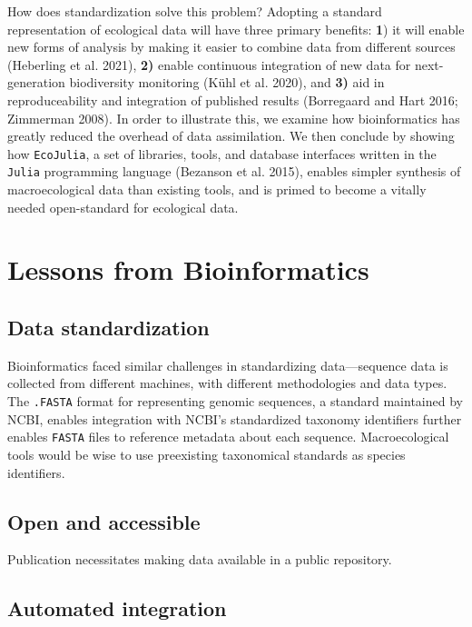 \documentclass[11pt]{article}
\begin{document}
How does standardization solve this problem? Adopting a standard
representation of ecological data will have three primary benefits:
\textbf{1}) it will enable new forms of analysis by making it easier to
combine data from different sources (Heberling et al. 2021), \textbf{2)}
enable continuous integration of new data for next-generation
biodiversity monitoring (Kühl et al. 2020), and \textbf{3)} aid in
reproduceability and integration of published results (Borregaard and
Hart 2016; Zimmerman 2008). In order to illustrate this, we examine how
bioinformatics has greatly reduced the overhead of data assimilation. We
then conclude by showing how \texttt{EcoJulia}, a set of libraries,
tools, and database interfaces written in the \texttt{Julia} programming
language (Bezanson et al. 2015), enables simpler synthesis of
macroecological data than existing tools, and is primed to become a
vitally needed open-standard for ecological data.

\hypertarget{lessons-from-bioinformatics}{%
\section{Lessons from
Bioinformatics}\label{lessons-from-bioinformatics}}

\hypertarget{data-standardization}{%
\subsection{Data standardization}\label{data-standardization}}

Bioinformatics faced similar challenges in standardizing data---sequence
data is collected from different machines, with different methodologies
and data types. The \texttt{.FASTA} format for representing genomic
sequences, a standard maintained by NCBI, enables integration with
NCBI's standardized taxonomy identifiers further enables \texttt{FASTA}
files to reference metadata about each sequence. Macroecological tools
would be wise to use preexisting taxonomical standards as species
identifiers.

\hypertarget{open-and-accessible}{%
\subsection{Open and accessible}\label{open-and-accessible}}

Publication necessitates making data available in a public repository.

\hypertarget{automated-integration}{%
\subsection{Automated integration}\label{automated-integration}}
\end{document}
